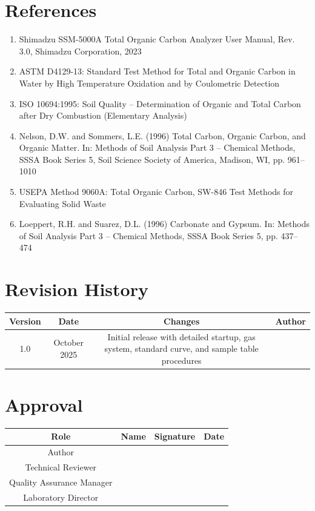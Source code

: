 \documentclass[11pt,a4paper]{article}\usepackage[]{graphicx}\usepackage[]{xcolor}
\begin{document}
\section{References}

\begin{enumerate}
    \item Shimadzu SSM-5000A Total Organic Carbon Analyzer User Manual, Rev. 3.0, Shimadzu Corporation, 2023
    \item ASTM D4129-13: Standard Test Method for Total and Organic Carbon in Water by High Temperature Oxidation and by Coulometric Detection
    \item ISO 10694:1995: Soil Quality -- Determination of Organic and Total Carbon after Dry Combustion (Elementary Analysis)
    \item Nelson, D.W. and Sommers, L.E. (1996) Total Carbon, Organic Carbon, and Organic Matter. In: Methods of Soil Analysis Part 3 -- Chemical Methods, SSSA Book Series 5, Soil Science Society of America, Madison, WI, pp. 961--1010
    \item USEPA Method 9060A: Total Organic Carbon, SW-846 Test Methods for Evaluating Solid Waste
    \item Loeppert, R.H. and Suarez, D.L. (1996) Carbonate and Gypsum. In: Methods of Soil Analysis Part 3 -- Chemical Methods, SSSA Book Series 5, pp. 437--474
\end{enumerate}

\section{Revision History}

\begin{table}[h]
\centering
\begin{tabular}{cccc}
\toprule
\textbf{Version} & \textbf{Date} & \textbf{Changes} & \textbf{Author} \\
\midrule
1.0 & October 2025 & Initial release with detailed startup, gas system, standard curve, and sample table procedures & \\
\bottomrule
\end{tabular}
\end{table}

\section{Approval}

\begin{table}[h]
\centering
\begin{tabular}{cccc}
\toprule
\textbf{Role} & \textbf{Name} & \textbf{Signature} & \textbf{Date} \\
\midrule
Author & & & \\[0.5cm]
Technical Reviewer & & & \\[0.5cm]
Quality Assurance Manager & & & \\[0.5cm]
Laboratory Director & & & \\[0.5cm]
\bottomrule
\end{tabular}
\end{table}
\end{document}
